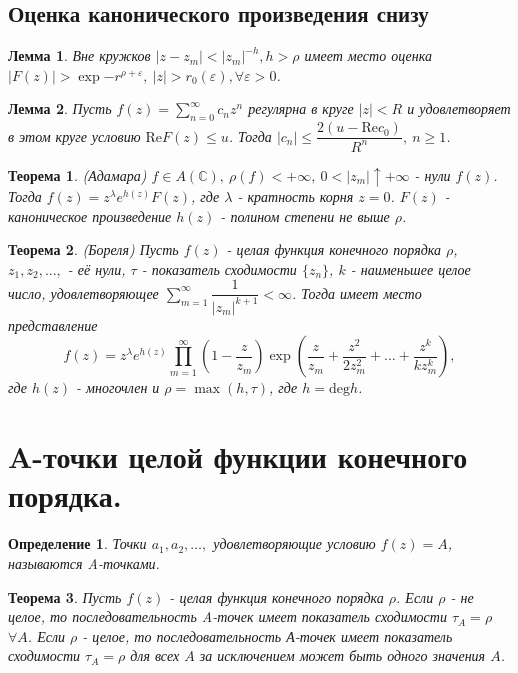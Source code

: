 \documentclass[9pt]{article}
\newtheorem{theorem}{Теорема} %
\newtheorem{lemma}{Лемма} %
\newtheorem{definition}{Определение}
\begin{document}
		\subsection*{Оценка канонического произведения снизу}
			\begin{lemma}
				Вне кружков $|z-z_m| < |z_m|^{-h}, h > \rho$ имеет место оценка $|F(z)| > \exp{-r^{\rho + \varepsilon}}, \ |z| > r_0(\varepsilon), \forall \varepsilon > 0$.
			\end{lemma}
			\begin{lemma}
				Пусть $f(z) = \sum\limits_{n=0}^{\infty} c_nz^n$ регулярна в круге $|z| < R$ и удовлетворяет в этом круге условию $\mathrm{Re} F(z) \leq u$. Тогда $|c_n| \leq \dfrac{2(u-\mathrm{Re}c_0)}{R^n}, \ n \geq 1$.
			\end{lemma}
			\begin{theorem}(Адамара)\newline
				$f \in A(\mathbb{C}), \ \rho(f) < + \infty, \ 0 < |z_m| \uparrow +\infty$ - нули $f(z)$. Тогда $f(z) = z^\lambda e^{h(z)} F(z)$, где $\lambda$ - кратность корня $z=0$. $F(z)$ - каноническое произведение $h(z)$ - полином степени не выше $\rho$.
			\end{theorem}
			\begin{theorem} (Бореля)
				Пусть $f(z)$ - целая функция конечного порядка $\rho$, $z_1, z_2, \dots , $ - её нули, $\tau$ - показатель сходимости $\{z_n\}$, $k$ - наименьшее целое число, удовлетворяющее $\sum\limits_{m=1}^{\infty} \dfrac{1}{|z_m|^{k+1}} < \infty$. Тогда имеет место представление 
				$$
				f(z) = z^\lambda e^{h(z)} \prod_{m=1}^{\infty} \left(1 - \dfrac{z}{z_m}\right) \exp{\left(\dfrac{z}{z_m} + \dfrac{z^2}{2z_m^2} + \dots + \dfrac{z^k}{kz_m^k}\right)},
				$$
				где $h(z)$ - многочлен и $\rho = \max(h, \tau)$, где $h = \mathrm{deg}h$.
			\end{theorem}
			
		\section{ A-точки целой функции конечного порядка.}
		\begin{definition}
			Точки $a_1, a_2, \dots, $ удовлетворяющие условию $f(z) = A$, называются A-точками.
		\end{definition}
		\begin{theorem}
			Пусть $f(z)$ - целая функция конечного порядка $\rho$. Если $\rho$ - не целое, то последовательность A-точек имеет показатель сходимости $\tau_A = \rho$ $\forall A$. Если $\rho$ - целое, то последовательность А-точек имеет показатель сходимости $\tau_A = \rho$  для всех $A$  за исключением может быть одного значения $A$.
		\end{theorem}
		
\end{document}
